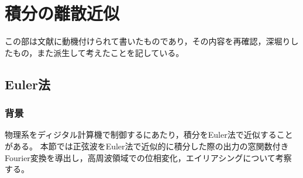 \chapter{積分の離散近似}
    この部は文献\cite{digital-servo}に動機付けられて書いたものであり，その内容を再確認，深堀りしたもの，また派生して考えたことを記している。
    \section{Euler法}
        \subsection{背景}
            物理系をディジタル計算機で制御するにあたり，積分をEuler法で近似することがある。
            本節では正弦波をEuler法で近似的に積分した際の出力の窓関数付きFourier変換を導出し，高周波領域での位相変化，エイリアシングについて考察する。
